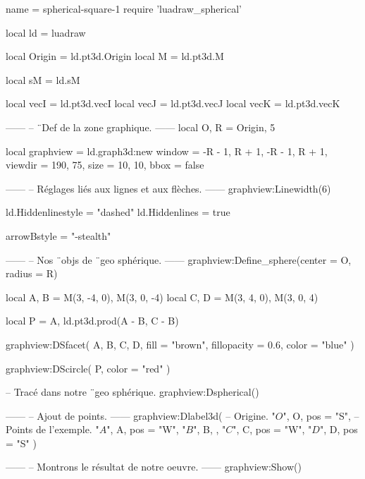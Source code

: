 \documentclass[border = 3pt]{standalone}
\begin{document}
\begin{luadraw*}{name = spherical-square-1}
require 'luadraw_spherical'

local ld = luadraw

local Origin = ld.pt3d.Origin
local M      = ld.pt3d.M

local sM = ld.sM

local vecI = ld.pt3d.vecI
local vecJ = ld.pt3d.vecJ
local vecK = ld.pt3d.vecK

------
-- ¨Def de la zone graphique.
------
local O, R = Origin, 5

local graphview = ld.graph3d:new{
  window  = {-R - 1, R + 1, -R - 1, R + 1},
  viewdir = {190, 75},
  size    = {10, 10},
  bbox    = false
}

------
-- Réglages liés aux lignes et aux flèches.
------
graphview:Linewidth(6)

ld.Hiddenlinestyle = "dashed"
ld.Hiddenlines     = true

arrowBstyle = "-stealth"

------
-- Nos ¨objs de ¨geo sphérique.
------
graphview:Define_sphere({center = O, radius = R})

local A, B = M(3, -4, 0), M(3, 0, -4)
local C, D = M(3, 4, 0), M(3, 0, 4)

local P = {A, ld.pt3d.prod(A - B, C - B)}

graphview:DSfacet(
  {A, B, C, D},
  {fill = "brown", fillopacity = 0.6, color = "blue"}
)

graphview:DScircle(
  P,
  {color = "red"}
)

-- Tracé dans notre ¨geo sphérique.
graphview:Dspherical()

------
-- Ajout de points.
------
graphview:Dlabel3d(
-- Origine.
  "$O$", O, {pos = "S"},
-- Points de l'exemple.
  "$A$", A, {pos = "W"},
  "$B$", B, {},
  "$C$", C, {pos = "W"},
  "$D$", D, {pos = "S"}
)

------
-- Montrons le résultat de notre oeuvre.
------
graphview:Show()
\end{luadraw*}
\end{document}
